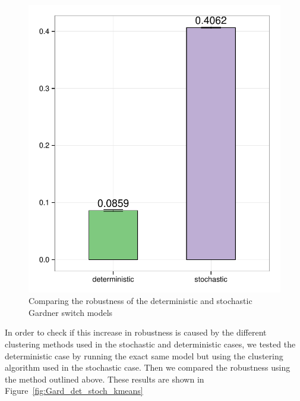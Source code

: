 \begin{figure}[h]
\centering
\includegraphics[scale=0.6]{chapterModelling/images/Gardner/wide_var/robustness_comparison.pdf}
\caption{Comparing the robustness of the deterministic and stochastic Gardner switch models}
\label{fig:Gard_robst}
\end{figure}



In order to check if this increase in robustness is caused by the different clustering methods used in the stochastic and deterministic cases, we tested the deterministic case by running the exact same model but using the clustering algorithm used in the stochastic case. Then we compared the robustness using the method outlined above. These results are shown in Figure~\ref{fig:Gard_det_stoch_kmeans}

